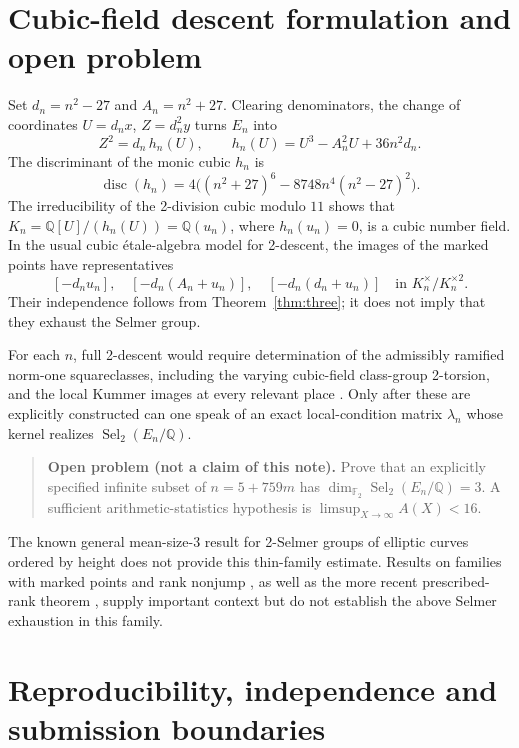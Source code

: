 \documentclass[11pt]{article}
\newcommand{\Q}{\mathbb Q}
\newcommand{\F}{\mathbb F}
\newcommand{\Sel}{\operatorname{Sel}}
\begin{document}
\section{Cubic-field descent formulation and open problem}

Set $d_n=n^2-27$ and $A_n=n^2+27$. Clearing denominators,
the change of coordinates $U=d_n x$, $Z=d_n^2 y$ turns
$E_n$ into
\begin{equation}\label{eq:cubic}
 Z^2=d_n\,h_n(U),\qquad
 h_n(U)=U^3-A_n^2 U+36n^2d_n.
\end{equation}
The discriminant of the monic cubic $h_n$ is
\[
 \operatorname{disc}(h_n)
 =4\big((n^2+27)^6-8748n^4(n^2-27)^2\big).
\]
The irreducibility of the 2-division cubic modulo $11$
shows that
$K_n=\Q[U]/(h_n(U))=\Q(u_n)$, where $h_n(u_n)=0$, is a cubic number field.
In the usual cubic \'etale-algebra model for 2-descent,
the images of the marked points have representatives
\[
 [-d_nu_n],\quad
 [-d_n(A_n+u_n)],\quad
 [-d_n(d_n+u_n)]
 \quad\text{in }K_n^\times/K_n^{\times2}.
\]
Their independence follows from Theorem~\ref{thm:three};
it does not imply that they exhaust the Selmer group.

For each $n$, full 2-descent would require determination of
the admissibly ramified norm-one squareclasses, including
the varying cubic-field class-group 2-torsion, and the
local Kummer images at every relevant place
\cite{Schaefer2003}. Only after these are explicitly
constructed can one speak of an exact local-condition
matrix $\lambda_n$ whose kernel realizes $\Sel_2(E_n/\Q)$.

\begin{quote}
\textbf{Open problem (not a claim of this note).}
Prove that an explicitly specified infinite subset of
$n=5+759m$ has
$\dim_{\F_2}\Sel_2(E_n/\Q)=3$.
A sufficient arithmetic-statistics hypothesis is
$\limsup_{X\to\infty}A(X)<16$.
\end{quote}

The known general mean-size-$3$ result for 2-Selmer
groups of elliptic curves ordered by height
\cite{BhargavaShankar2015} does not provide this
thin-family estimate. Results on families with marked
points \cite{BhargavaHo2022} and rank nonjump
\cite{Zywina2025}, as well as the more recent
prescribed-rank theorem \cite{Zywina2026}, supply
important context but do not establish the above
Selmer exhaustion in this family.

\section{Reproducibility, independence and submission boundaries}
\end{document}
